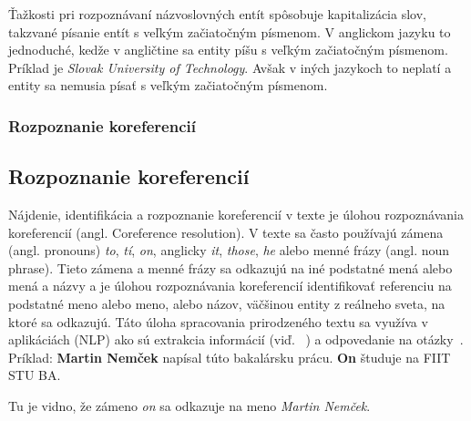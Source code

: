 Ťažkosti pri rozpoznávaní názvoslovných entít spôsobuje kapitalizácia slov, takzvané písanie entít s veľkým začiatočným písmenom. V anglickom jazyku to jednoduché, kedže v angličtine sa entity píšu s veľkým začiatočným písmenom. Príklad je \textit{Slovak University of Technology}. Avšak v iných jazykoch to neplatí a entity sa nemusia písať s veľkým začiatočným písmenom.

%
%
{
	\subsubsection{Rozpoznanie koreferencií}
}
{
	\subsection{Rozpoznanie koreferencií}
}
\label{subsubsec:corefparsing}
Nájdenie, identifikácia a rozpoznanie koreferencií v texte je úlohou rozpoznávania koreferencií (angl. Coreference resolution). V texte sa často používajú zámena (angl. pronouns) \textit{to}, \textit{tí}, \textit{on}, anglicky \textit{it}, \textit{those}, \textit{he} alebo menné frázy (angl. noun phrase). Tieto zámena a menné frázy sa odkazujú na iné podstatné mená alebo mená a názvy a je úlohou rozpoznávania koreferencií identifikovať referenciu na podstatné meno alebo meno, alebo názov, väčšinou entity z reálneho sveta, na ktoré sa odkazujú. Táto úloha spracovania prirodzeného textu sa využíva v aplikáciách (NLP) ako sú extrakcia informácií (viď. ~) a odpovedanie na otázky~\cite{Bryl}.
\\

Príklad:
\textbf{Martin Nemček} napísal túto bakalársku prácu. \textbf{On} študuje na FIIT STU BA.

Tu je vidno, že zámeno \textit{on} sa odkazuje na meno \textit{Martin Nemček}.


